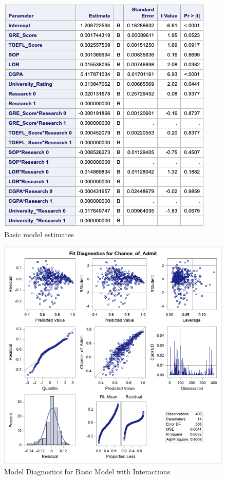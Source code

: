 \documentclass{article}
\begin{document}
\begin{figure}
\includegraphics[scale=1]{basic_model_estimates.png}
\caption{Basic model estimates}
\label{fig:basicmodelestimate}
\end{figure}

\begin{figure}
\centering
\includegraphics[scale=0.7]{basic_model_diagnostics.png}
\caption{Model Diagnostics for Basic Model with Interactions}
\label{fig:basicmodeldiagnostics}
\end{figure}
\end{document}
